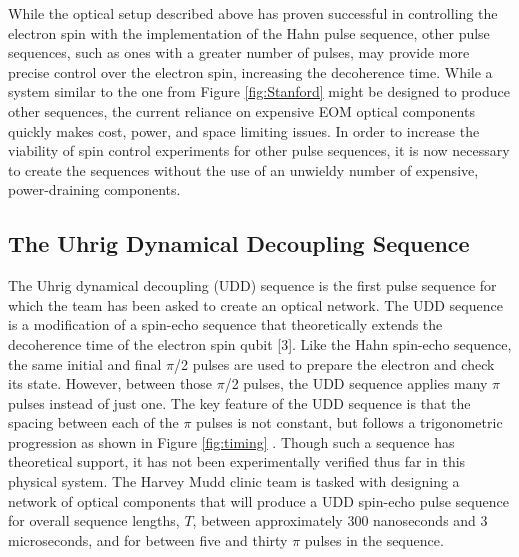 \documentclass[pdftex,12pt,a4paper]{article}
\begin{document}
While the optical setup described above has proven successful in controlling the electron spin with the implementation of the Hahn pulse sequence, other pulse sequences, such as ones with a greater number of pulses, may provide more precise control over the electron spin, increasing the decoherence time. While a system similar to the one from Figure \ref{fig:Stanford} might be designed to produce other sequences, the current reliance on expensive EOM optical components quickly makes cost, power, and space limiting issues. In order to increase the viability of spin control experiments for other pulse sequences, it is now necessary to create the sequences without the use of an unwieldy number of expensive, power-draining components.       

\subsection{The Uhrig Dynamical Decoupling Sequence}
\label{UDD}

The Uhrig dynamical decoupling (UDD) sequence is the first pulse sequence for which the team has been asked to create an optical network. The UDD sequence is a modification of a spin-echo sequence that theoretically extends the decoherence time of the electron spin qubit [3]. Like the Hahn spin-echo sequence, the same initial and final $\pi$/2 pulses are used to prepare the electron and check its state. However, between those $\pi$/2 pulses, the UDD sequence applies many $\pi$ pulses instead of just one. The key feature of the UDD sequence is that the spacing between each of the $\pi$ pulses is not constant, but follows a trigonometric progression as shown in Figure \ref{fig:timing} \cite{Uhrig}. Though such a sequence has theoretical support, it has not been experimentally verified thus far in this physical system. The Harvey Mudd clinic team is tasked with designing a network of optical components that will produce a UDD spin-echo pulse sequence for overall sequence lengths, $T$, between approximately 300 nanoseconds and 3 microseconds, and for between five and thirty $\pi$ pulses in the sequence.
\end{document}
